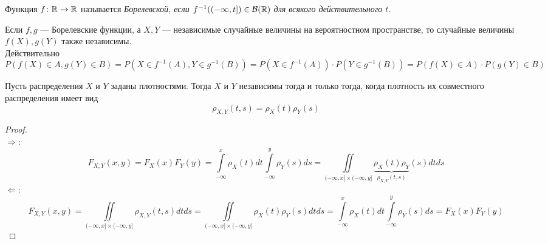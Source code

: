 \begin{comment}
    Обоснование счётной-аддитивности $Q(A)$:\\
    Заметим, что $\{X \in A, Y \in B\} = \{X \in A\} \cap \{Y \in B\}$. Тогда
    \begin{align*}
        Q\left( \bigcup_{k = 1}^{\infty} A_k \right) &=
        \frac{P\left(\left\{
        X \in \bigcup\limits_{k = 1}^{\infty} A_k, Y \in B
        \right\}\right)}{P(Y \in B)} =
        \frac{P\left(\left\{
        X \in \bigcup\limits_{k = 1}^{\infty} A_k\right\} \cap \left\{ Y \in B
        \right\}\right)}{P(Y \in B)} =
        \frac{P\left( \bigcup\limits_{k = 1}^{\infty}
        \{X \in A_k\} \cap \{ Y \in B
        \}\right)}{P(Y \in B)} =\\
        &= \sum\limits_{k = 1}^{\infty} Q(A_k)
    \end{align*}
    В последнем переходе использована счётная аддитивность $P$.
\end{comment}
\begin{definition}
    Функция $f \colon \mathbb{R} \to \mathbb{R}$ называется \it{Борелевской}, если $f^{-1}((-\infty, t]) \in \mathcal{B}(\mathbb{R})$
    для всякого действительного $t$.
\end{definition}
\begin{corollary}
    Если $f, g$ --- Борелевские функции, а $X, Y$ --- независимые случайные величины на вероятностном пространстве,
    то случайные величины $f(X), g(Y)$ также независимы.\\
    Действительно
    \[
        P(f(X) \in A, g(Y) \in B) = P(X \in f^{-1}(A), Y \in g^{-1}(B)) =
        P(X \in f^{-1}(A)) \cdot P(Y \in g^{-1}(B)) = P(f(X) \in A) \cdot P(g(Y) \in B)
    \]
\end{corollary}
\begin{proposal}
    Пусть распределения $X$ и $Y$ заданы плотностями. Тогда $X$ и $Y$ независимы тогда и только тогда, когда
    плотность их совместного распределения имеет вид
    \[
        \rho_{X, Y}(t, s) = \rho_X(t)\rho_Y(s)
    \]
\end{proposal}
\begin{proof}
    ~\\
    $\Rightarrow \colon$
    \[
        F_{X, Y} (x, y) = F_X(x)F_Y(y) = \int\limits_{-\infty}^{x} \rho_X(t)dt
        \int\limits_{-\infty}^{y} \rho_Y(s)ds = \iint\limits_{(-\infty, x] \times (-\infty, y]}
        \underbrace{\rho_X(t)\rho_Y}_{\rho_{X, Y}(t, s)}(s)dtds
    \]
    $\Leftarrow \colon$
    \[
        F_{X, Y} (x, y) = \iint\limits_{(-\infty, x] \times (-\infty, y]}
        \rho_{X, Y}(t, s)dtds = \iint\limits_{(-\infty, x] \times (-\infty, y]}
        \rho_X(t)\rho_Y(s)dtds = \int\limits_{-\infty}^{x} \rho_X(t)dt
        \int\limits_{-\infty}^{y} \rho_Y(s)ds = F_X(x)F_Y(y)
    \]
\end{proof}
